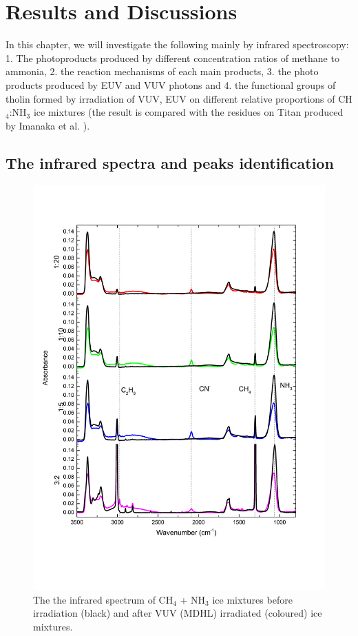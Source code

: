 \chapter{\protect Results and Discussions}
\label{results}
In this chapter, we will investigate the following mainly by infrared spectroscopy: 1. The photoproducts produced by different concentration ratios of methane to ammonia, 2. the reaction mechanisms of each main products, 3. the photo products produced by EUV and VUV photons and 4. the functional groups of tholin formed by irradiation of VUV, EUV on different relative proportions of CH$_4$:NH$_3$ ice mixtures (the result is compared with the residues on Titan produced by Imanaka et al. \cite{imanaka2004laboratory}).

\section{The infrared spectra and peaks identification}
\begin{figure}
\centering
\includegraphics[width=\textwidth]{figures/chapter3/widerange.png}
\caption{The the infrared spectrum of CH$_4$ + NH$_3$ ice mixtures before irradiation (black) and after VUV (MDHL) irradiated (coloured) ice mixtures. }
\label{fig:widerange}
\end{figure}

